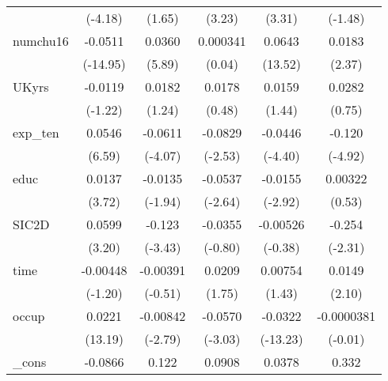 \begin{table}[htbp]
\begin{tabular}{l*{5}{c}}
            &     (-4.18)         &      (1.65)         &      (3.23)         &      (3.31)         &     (-1.48)         \\
numchu16    &     -0.0511\sym{***}&      0.0360\sym{***}&    0.000341         &      0.0643\sym{***}&      0.0183\sym{*}  \\
            &    (-14.95)         &      (5.89)         &      (0.04)         &     (13.52)         &      (2.37)         \\
UKyrs       &     -0.0119         &      0.0182         &      0.0178         &      0.0159         &      0.0282         \\
            &     (-1.22)         &      (1.24)         &      (0.48)         &      (1.44)         &      (0.75)         \\
exp\_ten     &      0.0546\sym{***}&     -0.0611\sym{***}&     -0.0829\sym{*}  &     -0.0446\sym{***}&      -0.120\sym{***}\\
            &      (6.59)         &     (-4.07)         &     (-2.53)         &     (-4.40)         &     (-4.92)         \\
educ        &      0.0137\sym{***}&     -0.0135         &     -0.0537\sym{**} &     -0.0155\sym{**} &     0.00322         \\
            &      (3.72)         &     (-1.94)         &     (-2.64)         &     (-2.92)         &      (0.53)         \\
SIC2D       &      0.0599\sym{**} &      -0.123\sym{***}&     -0.0355         &    -0.00526         &      -0.254\sym{*}  \\
            &      (3.20)         &     (-3.43)         &     (-0.80)         &     (-0.38)         &     (-2.31)         \\
time        &    -0.00448         &    -0.00391         &      0.0209         &     0.00754         &      0.0149\sym{*}  \\
            &     (-1.20)         &     (-0.51)         &      (1.75)         &      (1.43)         &      (2.10)         \\
occup       &      0.0221\sym{***}&    -0.00842\sym{**} &     -0.0570\sym{**} &     -0.0322\sym{***}&  -0.0000381         \\
            &     (13.19)         &     (-2.79)         &     (-3.03)         &    (-13.23)         &     (-0.01)         \\
\_cons      &     -0.0866\sym{***}&       0.122\sym{**} &      0.0908         &      0.0378         &       0.332\sym{**} \\

\end{tabular}
\end{table}
